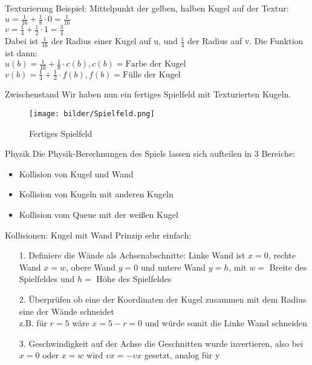 \begin{frame}{Texturierung}
Beispiel: Mittelpunkt der gelben, halben Kugel auf der Textur: \\
	$u = \frac{1}{16} + \frac{1}{8} \cdot 0 = \frac{1}{16}$\\
	$v = \frac{1}{4} + \frac{1}{2} \cdot 1= \frac{3}{4}$ \\
Dabei ist $\frac{1}{16}$ der Radius einer Kugel auf u, und $\frac{1}{4}$ der Radius auf v.
Die Funktion ist dann: \\
$	u(b) = \frac{1}{16} + \frac{1}{8} \cdot c(b), c(b) = \text{Farbe der Kugel}$\\
$v(b) = \frac{1}{4} + \frac{1}{2} \cdot f(b), f(b) = \text{Fülle der Kugel}$\\
\end{frame}
\begin{frame}{Zwischenstand}
Wir haben nun ein fertiges Spielfeld mit Texturierten Kugeln.
\begin{figure}
	\caption{Fertiges Spielfeld}
	\texttt{[image: bilder/Spielfeld.png]}
\end{figure}
\end{frame}
\begin{frame}{Physik}
Die Physik-Berechnungen des Spiels lassen sich aufteilen in 3 Bereiche:
\begin{itemize}
	\item Kollision von Kugel und Wand
	\item Kollision von Kugeln mit anderen Kugeln
	\item Kollision vom Queue mit der weißen Kugel
\end{itemize}
\end{frame}
\begin{frame}{Kollisionen: Kugel mit Wand}
Prinzip sehr einfach:
\begin{itemize}
	\item [1.] Definiere die Wände als Achsenabschnitte: Linke Wand ist $x=0$, rechte Wand $x=w$, obere Wand $y=0$ und untere Wand $y=h$, mit $w = $ Breite des Spielfeldes und $h = $ Höhe des Spielfeldes
	\item [2.] Überprüfen ob eine der Koordinaten der Kugel zusammen mit dem Radius eine der Wände schneidet \\
				z.B. für $r=5$ wäre $x = 5 - r = 0 $ und würde somit die Linke Wand schneiden
	\item [3.] Geschwindigkeit auf der Achse die Geschnitten wurde invertieren, also bei $x=0$ oder $x=w$ wird $vx = -vx$ gesetzt, analog für y
\end{itemize}
\end{frame}
